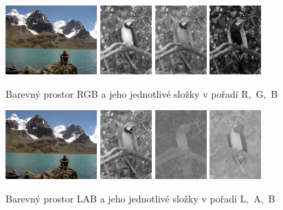 \documentclass[czech,BP]{thesiskiv}
\begin{document}
\begin{figure}[H]
		\centering
		\includegraphics[height=100px]{./img/img_histogram.jpg}
		\includegraphics[height=100px]{./img/bgr_r.jpg}
		\includegraphics[height=100px]{./img/bgr_g.jpg}
		\includegraphics[height=100px]{./img/bgr_b.jpg}	
		\caption{Barevný prostor RGB a jeho jednotlivé složky v pořadí R,~G,~B}
\end{figure}

\begin{figure}[H]
		\centering
		\includegraphics[height=100px]{./img/img_histogram.jpg}
		\includegraphics[height=100px]{./img/lab_l.jpg}
		\includegraphics[height=100px]{./img/lab_a.jpg}
		\includegraphics[height=100px]{./img/lab_b.jpg}	
		\caption{Barevný prostor LAB a jeho jednotlivé složky v pořadí L,~A,~B}
\end{figure}
\end{document}
